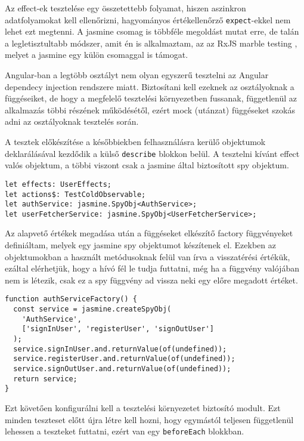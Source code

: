 \documentclass[a4paper,12pt]{report}
\begin{document}
Az effect-ek tesztelése egy összetettebb folyamat, hiszen aszinkron adatfolyamokat kell ellenőrizni, hagyományos értékellenőrző \verb|expect|-ekkel nem lehet ezt megtenni. A jasmine csomag is többféle megoldást mutat erre, de talán a legletisztultabb módszer, amit én is alkalmaztam, az az RxJS marble testing \cite{rxjs-marbles}, melyet a jasmine egy külön csomaggal is támogat.

Angular-ban a legtöbb osztályt nem olyan egyszerű tesztelni az Angular dependecy injection rendszere miatt. Biztosítani kell ezeknek az osztályoknak a függéseiket, de hogy a megfelelő tesztelési környezetben fussanak, függetlenül az alkalmazás többi részének működésétől, ezért mock (utánzat) függéseket szokás adni az osztályoknak tesztelés során.

A tesztek előkészítése a későbbiekben felhasználásra kerülő objektumok deklarálásával kezdődik a külső \verb|describe| blokkon belül. A tesztelni kívánt effect valós objektum, a többi viszont csak a jasmine által biztosított spy objektum.

\begin{samepage}
    \begin{verbatim}
let effects: UserEffects;
let actions$: TestColdObservable;
let authService: jasmine.SpyObj<AuthService>;
let userFetcherService: jasmine.SpyObj<UserFetcherService>;
    \end{verbatim}
\end{samepage}

Az alapvető értékek megadása után a függéseket elkészítő factory függvényeket definiáltam, melyek egy jasmine spy objektumot készítenek el. Ezekben az objektumokban a használt metódusoknak felül van írva a visszatérési értékük, ezáltal elérhetjük, hogy a hívó fél le tudja futtatni, még ha a függvény valójában nem is létezik, csak ez a spy függvény ad vissza neki egy előre megadott értéket.

\begin{samepage}
    \begin{verbatim}
function authServiceFactory() {
  const service = jasmine.createSpyObj(
    'AuthService',
    ['signInUser', 'registerUser', 'signOutUser']
  );
  service.signInUser.and.returnValue(of(undefined));
  service.registerUser.and.returnValue(of(undefined));
  service.signOutUser.and.returnValue(of(undefined));
  return service;
}
    \end{verbatim}
\end{samepage}

Ezt követően konfigurálni kell a tesztelési környezetet biztosító modult. Ezt minden teszteset előtt újra létre kell hozni, hogy egymástól teljesen függetlenül lehessen a teszteket futtatni, ezért van egy \verb|beforeEach| blokkban.
\end{document}
